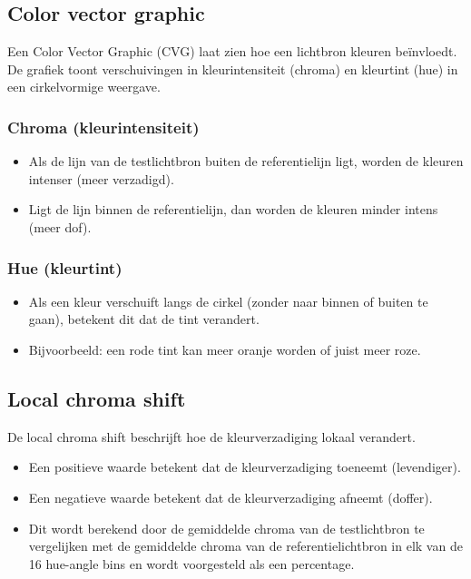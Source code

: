 \subsection{Color vector graphic}

Een Color Vector Graphic (CVG) laat zien hoe een lichtbron kleuren be\"invloedt. De grafiek toont verschuivingen in kleurintensiteit (chroma) en kleurtint (hue) in een cirkelvormige weergave.

\subsubsection{Chroma (kleurintensiteit)}
\begin{itemize}
    \item Als de lijn van de testlichtbron buiten de referentielijn ligt, worden de kleuren intenser (meer verzadigd).
    \item Ligt de lijn binnen de referentielijn, dan worden de kleuren minder intens (meer dof).
\end{itemize}

\subsubsection*{Hue (kleurtint)}
\begin{itemize}
    \item Als een kleur verschuift langs de cirkel (zonder naar binnen of buiten te gaan), betekent dit dat de tint verandert.
    \item Bijvoorbeeld: een rode tint kan meer oranje worden of juist meer roze.
\end{itemize}

\subsection{Local chroma shift}

De local chroma shift beschrijft hoe de kleurverzadiging lokaal verandert.

\begin{itemize}
    \item Een positieve waarde betekent dat de kleurverzadiging toeneemt (levendiger).
    \item Een negatieve waarde betekent dat de kleurverzadiging afneemt (doffer).
    \item Dit wordt berekend door de gemiddelde chroma van de testlichtbron te vergelijken met de gemiddelde chroma van de referentielichtbron in elk van de 16 hue-angle bins en wordt voorgesteld als een percentage.
\end{itemize}

